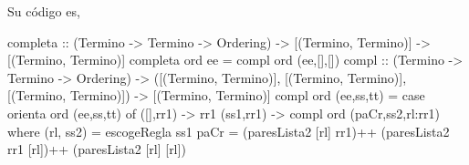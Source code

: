 \begin{itemize}
Su código es,

\begin{codigo}
completa :: (Termino -> Termino -> Ordering)
            -> [(Termino, Termino)] -> [(Termino, Termino)]
completa ord ee = compl ord (ee,[],[])
compl :: (Termino -> Termino -> Ordering)
         -> ([(Termino, Termino)], [(Termino, Termino)],
             [(Termino, Termino)])
         -> [(Termino, Termino)]
compl ord (ee,ss,tt) = case orienta ord (ee,ss,tt) of
                         ([],rr1)  -> rr1
                         (ss1,rr1) -> compl ord
                                      (paCr,ss2,rl:rr1)
      where (rl, ss2) = escogeRegla ss1
            paCr = (paresLista2 [rl] rr1)++
                   (paresLista2 rr1 [rl])++
                   (paresLista2 [rl] [rl])
\end{codigo}

\end{itemize}

           


\clearpage
\addappheadtotoc
\appendix


